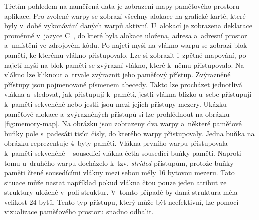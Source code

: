 Třetím pohledem na naměřená data je zobrazení mapy paměťového prostoru aplikace. Pro zvolené warpy se zobrazí všechny alokace na grafické kartě, které byly v~době vykonávání daných warpů aktivní. U~alokací je zobrazena deklarace proměnné v~jazyce C~, do které byla alokace uložena, adresa a~adresní prostor a~umístění ve zdrojovém kódu. Po najetí myši na vlákno warpu se zobrazí blok paměti, ke kterému vlákno přistupovalo. Lze si zobrazit i~zpětné mapování, po najetí myši na blok paměti se zvýrazní vlákno, které k~němu přistupovalo. Na vlákno lze kliknout a~trvale zvýraznit jeho paměťový přístup. Zvýrazněné přístupy jsou pojmenované písmenem abecedy. Takto lze procházet jednotlivá vlákna a~sledovat, jak přistupují k~paměti, jestli vlákna blízko u~sebe přistupují k~paměti sekvenčně nebo jestli jsou mezi jejich přístupy mezery. Ukázku paměťové alokace a~zvýrazněných přístupů si lze prohlédnout na obrázku \ref{fig:memory-map}. Na obrázku jsou zobrazeny dva warpy a~některé paměťové buňky pole s~padesáti tisíci čísly, do kterého warpy přistupovaly. Jedna buňka na obrázku reprezentuje 4~byty paměti. Vlákna prvního warpu při\-stupovala k~paměti sekvenčně -- sousedící vlákna četla sousedící buňky paměti. Naproti tomu u~druhého warpu docházelo k~tzv. \emph{strided} přístupům, protože buňky paměti čtené sousedícími vlákny mezi sebou měly 16 bytovou mezeru. Tato situace může nastat například pokud vlákna čtou pouze jeden atribut ze struktury uložené v~poli struktur. V~tomto případě by daná struktura měla velikost 24 bytů. Tento typ přístupu, který může být neefektivní, lze pomocí vizualizace paměťového prostoru snadno odhalit.
